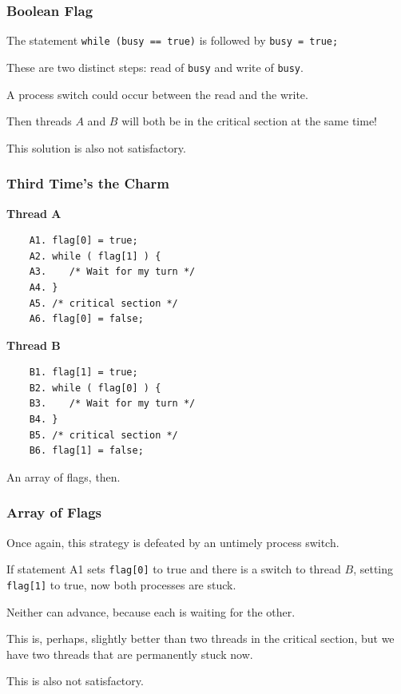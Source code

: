 \begin{frame}
	\frametitle{Boolean Flag}

	The statement \texttt{while (busy == true)} is followed by \texttt{busy = true;}

	These are two distinct steps: read of \texttt{busy} and write of \texttt{busy}.

	A process switch could occur between the read and the write.

	Then threads $A$ and $B$ will both be in the critical section at the same time!

	This solution is also not satisfactory.

\end{frame}

\begin{frame}[fragile]
	\frametitle{Third Time's the Charm}

	\begin{multicols}{2}
		\textbf{Thread A}
		\begin{verbatim}
	A1. flag[0] = true;
	A2. while ( flag[1] ) {
	A3.    /* Wait for my turn */
	A4. }
	A5. /* critical section */
	A6. flag[0] = false;
	\end{verbatim}
		\columnbreak
		\textbf{Thread B}
		\begin{verbatim}
	B1. flag[1] = true;
	B2. while ( flag[0] ) {
	B3.    /* Wait for my turn */
	B4. }
	B5. /* critical section */
	B6. flag[1] = false;
	\end{verbatim}
	\end{multicols}

	An array of flags, then.
\end{frame}

\begin{frame}
	\frametitle{Array of Flags}

	Once again, this strategy is defeated by an untimely process switch.

	If statement A1 sets \texttt{flag[0]} to true and there is a switch to thread $B$, setting \texttt{flag[1]} to true, now both processes are stuck.

	Neither can advance, because each is waiting for the other.

	This is, perhaps, slightly better than two threads in the critical section, but we have two threads that are permanently stuck now.

	This is also not satisfactory.

\end{frame}

